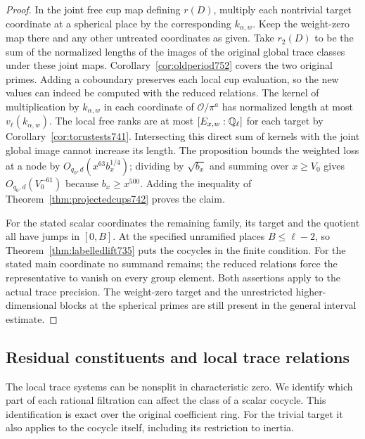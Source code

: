 \documentclass[a4paper,11pt]{article}
\theoremstyle{definition}
\theoremstyle{remark}
\numberwithin{equation}{section}
\begin{document}
\begin{proof}
In the joint free cup map defining \(r(D)\), multiply each
nontrivial target coordinate at a spherical place by the
corresponding \(k_{\alpha,w}\). Keep the weight-zero map there
and any other untreated coordinates as given. Take \(r_2(D)\)
to be the sum of the normalized lengths of the images of the
original global trace classes under these joint maps.
Corollary~\ref{cor:oldperiod752} covers the two original primes.
Adding a coboundary preserves each local cup evaluation, so the
new values can indeed be computed with the reduced relations.
The kernel of multiplication by \(k_{\alpha,w}\) in each
coordinate of \(\mathcal O/\pi^a\) has normalized length at
most \(v_\ell(k_{\alpha,w})\). The local free ranks are at
most \([E_{x,w}:\mathbb Q_\ell]\) for each target by
Corollary~\ref{cor:torustests741}. Intersecting this direct
sum of kernels with the joint global image cannot increase its
length. The proposition bounds the weighted loss at a node by
\(O_{q_0,d}(x^{63} b_x^{1/4})\); dividing by \(\sqrt{b_x}\)
and summing over \(x\ge V_0\) gives \(O_{q_0,d}(V_0^{-61})\)
because \(b_x\ge x^{500}\). Adding the inequality of
Theorem~\ref{thm:projectedcups742} proves the claim.

For the stated scalar coordinates the remaining family, its
target and the quotient all have jumps in \([0,B]\). At the
specified unramified places \(B\le\ell-2\), so
Theorem~\ref{thm:labelledlift735} puts the cocycles in the
finite condition. For the stated main coordinate no summand
remains; the reduced relations force the representative to
vanish on every group element. Both assertions apply to the
actual trace precision. The weight-zero target and the
unrestricted higher-dimensional blocks at the spherical primes
are still present in the general interval estimate.
\end{proof}
\clearpage

\subsection{Residual constituents and local trace relations}
\label{sec:residualtrace755}
The local trace systems can be nonsplit in characteristic zero.
We identify which part of each rational filtration can affect
the class of a scalar cocycle. This identification is exact
over the original coefficient ring. For the trivial target it
also applies to the cocycle itself, including its restriction
to inertia.
\end{document}
